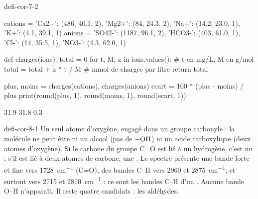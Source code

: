\begin{blocEdition}{defi-cor-7-2}
\label{figedition-defi-cor-7-2-1}
\begin{python}
cations = {'Ca2+': (486, 40.1, 2), 'Mg2+': (84, 24.3, 2),
           'Na+': (14.2, 23.0, 1), 'K+': (4.1, 39.1, 1)}
anions = {'SO42-': (1187, 96.1, 2), 'HCO3-': (403, 61.0, 1),
          'Cl-': (14, 35.5, 1), 'NO3-': (4.3, 62.0, 1)}

def charges(ions):
    total = 0
    for t, M, z in ions.values():      # t en mg/L, M en g/mol
        total = total + z * t / M      # mmol de charges par litre
    return total

plus, moins = charges(cations), charges(anions)
ecart = 100 * (plus - moins) / plus
print(round(plus, 1), round(moins, 1), round(ecart, 1))
\end{python}
\begin{console}
31.9 31.8 0.3
\end{console}
\end{blocEdition}

\begin{blocEdition}{defi-cor-8-1}
Un seul atome d'oxygène, engagé dans un groupe carbonyle : la molécule ne peut être ni un alcool (pas de $\ce{-OH}$) ni un acide
carboxylique (deux atomes d'oxygène). Si le carbone du groupe C=O est lié à un hydrogène, c'est un  ; s'il est
lié à deux atomes de carbone, une .
\label{figedition-defi-cor-8-1-1}
Le spectre présente une bande forte et fine vers \qty{1728}{cm^{-1}} (C=O), des bandes C--H vers 2960 et \qty{2875}{cm^{-1}}, et surtout
 vers 2715 et \qty{2810}{cm^{-1}} : ce sont les bandes C--H d'un . Aucune bande O--H n'apparaît.
Il reste quatre candidats : les aldéhydes.
\end{blocEdition}


